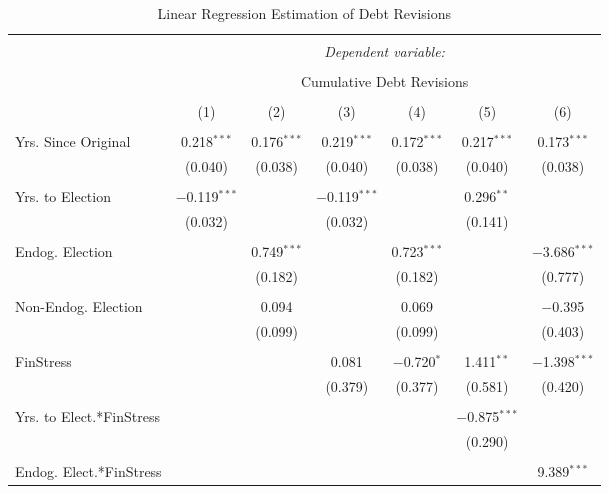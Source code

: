 
\begin{table}[!htbp] \centering 
  \caption{Linear Regression Estimation of Debt Revisions} 
  \label{debt_results} 
\tiny 
\begin{tabular}{@{\extracolsep{5pt}}lcccccc} 
\\[-1.8ex]\hline 
\hline \\[-1.8ex] 
 & \multicolumn{6}{c}{\textit{Dependent variable:}} \\ 
\cline{2-7} 
\\[-1.8ex] & \multicolumn{6}{c}{Cumulative Debt Revisions} \\ 
\\[-1.8ex] & (1) & (2) & (3) & (4) & (5) & (6)\\ 
\hline \\[-1.8ex] 
 Yrs. Since Original & 0.218$^{***}$ & 0.176$^{***}$ & 0.219$^{***}$ & 0.172$^{***}$ & 0.217$^{***}$ & 0.173$^{***}$ \\ 
  & (0.040) & (0.038) & (0.040) & (0.038) & (0.040) & (0.038) \\ 
  & & & & & & \\ 
 Yrs. to Election & $-$0.119$^{***}$ &  & $-$0.119$^{***}$ &  & 0.296$^{**}$ &  \\ 
  & (0.032) &  & (0.032) &  & (0.141) &  \\ 
  & & & & & & \\ 
 Endog. Election &  & 0.749$^{***}$ &  & 0.723$^{***}$ &  & $-$3.686$^{***}$ \\ 
  &  & (0.182) &  & (0.182) &  & (0.777) \\ 
  & & & & & & \\ 
 Non-Endog. Election &  & 0.094 &  & 0.069 &  & $-$0.395 \\ 
  &  & (0.099) &  & (0.099) &  & (0.403) \\ 
  & & & & & & \\ 
 FinStress &  &  & 0.081 & $-$0.720$^{*}$ & 1.411$^{**}$ & $-$1.398$^{***}$ \\ 
  &  &  & (0.379) & (0.377) & (0.581) & (0.420) \\ 
  & & & & & & \\ 
 Yrs. to Elect.*FinStress &  &  &  &  & $-$0.875$^{***}$ &  \\ 
  &  &  &  &  & (0.290) &  \\ 
  & & & & & & \\ 
 Endog. Elect.*FinStress &  &  &  &  &  & 9.389$^{***}$ \\ 

\end{tabular}
\end{table}
